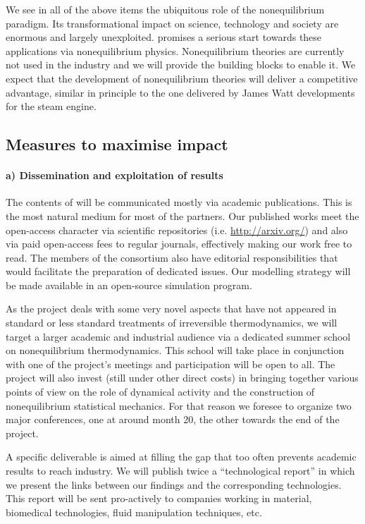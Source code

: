 We see in all of the above items the ubiquitous role of the nonequilibrium paradigm. Its
transformational impact on science, technology and society are enormous and largely
unexploited. \TheProject promises a serious start towards these applications via
nonequilibrium physics.
%
Nonequilibrium theories are currently not used in the industry and we will provide the
building blocks to enable it. We expect that the development of nonequilibrium theories
will deliver a competitive advantage, similar in principle to the one delivered by James
Watt developments for the steam engine.

\subsection{Measures to maximise impact}

\paragraph{a) Dissemination and exploitation of results}

The contents of \TheProject will be communicated mostly via academic publications. This is
the most natural medium for most of the partners.
%
Our published works meet the open-access character via scientific repositories
(i.e. \url{http://arxiv.org/}) and also via paid open-access fees to regular journals,
effectively making our work free to read.
%
The members of the consortium also have editorial responsibilities that would facilitate the
preparation of dedicated issues.
%
Our modelling strategy will be made available in an open-source simulation program.

As the project deals with some very novel aspects that have not appeared in standard or less
standard treatments of irreversible thermodynamics, we will target a larger academic and
industrial audience via a dedicated summer school on nonequilibrium thermodynamics. This
school will take place in conjunction with one of the project's meetings and participation
will be open to all.
%
The project will also invest (still under other direct costs) in bringing together various
points of view on the role of dynamical activity and the construction of nonequilibrium
statistical mechanics. For that reason we foresee to organize two major conferences, one at
around month 20, the other towards the end of the project.

A specific deliverable is aimed at filling the gap that too often prevents academic results
to reach industry. We will publish twice a ``technological report'' in which we present the
links between our findings and the corresponding technologies.
%
This report will be sent pro-actively to companies working in material, biomedical
technologies, fluid manipulation techniques, etc.

